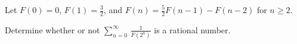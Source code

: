 Let \(F(0)=0\), \(F(1)=\frac32\), and \(F(n)=\frac{5}{2}F(n-1)-F(n-2)\)
for \(n\ge2\).

Determine whether or not $\displaystyle{\sum_{n=0}^{\infty}\,
    \frac{1}{F(2^n)}}$ is a rational number.